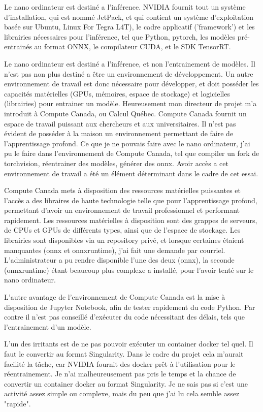 ﻿
\par Le nano ordinateur est destiné a l'inférence. NVIDIA fournit tout un système d'installation, qui est nommé JetPack, et qui contient un système d'exploitation basée sur Ubuntu, Linux For Tegra L4T), le cadre applicatif ('framework') et les librairies nécessaires pour l'inférence, tel que Python, pytorch, les modèles pré-entrainés au format ONNX, le compilateur CUDA, et le SDK TensorRT.
\par Le nano ordinateur est destiné a l'inférence, et non l'entrainement de modèles. Il n'est pas non plus destiné a être un environnement de développement. Un autre environnement de travail est donc nécessaire pour développer, et doit posséder les capacités matérielles (GPUs, mémoires, espace de stockage) et logicielles (librairies) pour entrainer un modèle. Heureusement mon directeur de projet m'a introduit à Compute Canada, ou Calcul Québec. Compute Canada fournit un espace de travail puissant aux chercheurs et aux universitaires. Il n'est pas évident de posséder à la maison un environnement permettant de faire de l'apprentissage profond. Ce que je ne pouvais faire avec le nano ordinateur, j'ai pu le faire dans l'environnement de Compute Canada, tel que compiler un fork de torchvision, réentrainer des modèles, générer des onnx. Avoir accès a cet environnement de travail a été un élément déterminant dans le cadre de cet essai.
\par Compute Canada mets à disposition des ressources matérielles puissantes et l'accès a des libraires de haute technologie telle que pour l'apprentissage profond, permettant d'avoir un environnement de travail professionnel et performant rapidement. Les ressources matérielles à disposition sont des grappes de serveurs, de CPUs et GPUs de différents types, ainsi que de l'espace de stockage. Les librairies sont disponibles via un repository privé, et lorsque certaines étaient manquantes (onnx et onnxruntime), j'ai fait une demande par courriel. L'administrateur a pu rendre disponible l'une des deux (onnx), la seconde (onnxruntime) étant beaucoup plus complexe a installé, pour l'avoir tenté sur le nano ordinateur. 
\par L'autre avantage de l'environnement de Compute Canada est la mise à disposition de Jupyter Notebook, afin de tester rapidement du code Python. Par contre il n'est pas conseillé d'exécuter du code nécessitant des délais, tels que l'entrainement d'un modèle. 
\par L'un des irritants est de ne pas pouvoir exécuter un container docker tel quel. Il faut le convertir au format Singularity. Dans le cadre du projet cela m'aurait facilité la tâche, car NVIDIA fournit des docker prêt à l'utilisation pour le réentrainement. Je n'ai malheureusement pas pris le temps et la chance de convertir un container docker au format Singularity. Je ne sais pas si c'est une activité assez simple ou complexe, mais du peu que j'ai lu cela semble assez "rapide".
